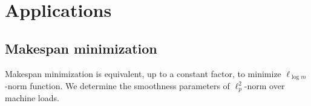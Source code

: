 
\section{Applications}

\subsection{Makespan minimization}


Makespan minimization is equivalent, up to a constant factor, to minimize $\ell_{\log m}$-norm function.
We determine the smoothness parameters of $\ell_{p}^{2}$-norm over machine loads.

%
%
%
%
